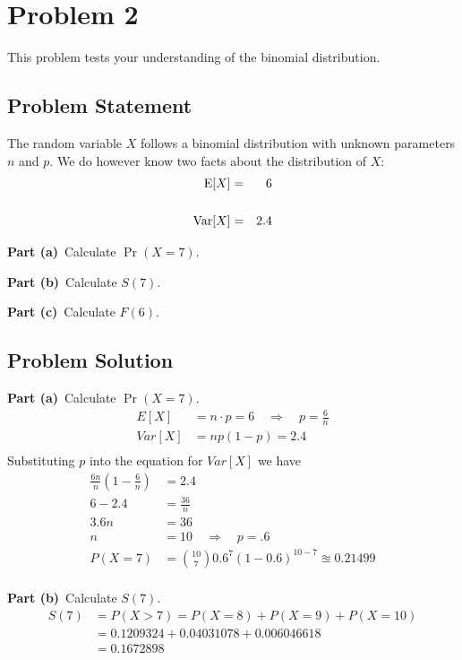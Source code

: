 \documentclass[12pt]{article}
\theoremstyle{definition}
\begin{document}
\newpage
\section*{Problem 2}

This problem tests your understanding of the binomial distribution.

\subsection*{Problem Statement}

The random variable $X$ follows a binomial distribution with unknown parameters $n$ and $p$. We do however know two facts about the distribution of $X$:
\begin{eqnarray*}
\hbox{E}[X] & = & 6\\
\\
\hbox{Var}[X] & = & 2.4
\end{eqnarray*}

\noindent
{\bf Part (a)}\ Calculate $\Pr(X = 7)$.


\bigskip
\noindent
{\bf Part (b)}\ Calculate $S(7)$.

\bigskip
\noindent
{\bf Part (c)}\ Calculate $F(6)$.



\subsection*{Problem Solution}

\noindent
{\bf Part (a)}\ Calculate $\Pr(X = 7)$.
\begin{align*}
E[X] &= n\cdot p = 6 \quad\Rightarrow\quad p =  \frac{6}{n}\\
Var[X] &= np(1-p) = 2.4\\
\end{align*}
Substituting $p$ into the equation for $Var[X]$ we have
\begin{align*}
\frac{6n}{n}(1 - \frac{6}{n}) &= 2.4\\
6 - 2.4 &= \frac{36}{n}\\
3.6n &= 36\\
n &= 10 \quad\Rightarrow\quad p = .6\\
P(X = 7) &= {10 \choose 7}0.6^7(1-0.6)^{10-7} \approxeq 0.21499\\
\end{align*}

\newpage
\noindent
{\bf Part (b)}\ Calculate $S(7)$.
\begin{align*}
S(7) &= P(X > 7) = P(X = 8) +  P(X = 9) + P(X = 10)\\
&= 0.1209324 + 0.04031078 + 0.006046618\\
& = 0.1672898\\
\end{align*}
\end{document}
